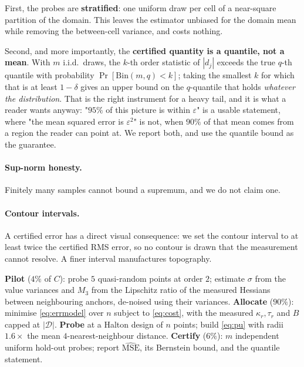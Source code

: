 \documentclass[11pt]{article}
\theoremstyle{definition}
\newcommand{\D}{\mathcal{D}}
\begin{document}
First, the probes are \textbf{stratified}: one uniform draw per cell of a near-square
partition of the domain. This leaves the estimator unbiased for the domain mean while
removing the between-cell variance, and costs nothing.

Second, and more importantly, the \textbf{certified quantity is a quantile, not a mean}.
With $m$ i.i.d.\ draws, the $k$-th order statistic of $|d_j|$ exceeds the true $q$-th
quantile with probability $\Pr[\mathrm{Bin}(m,q)<k]$; taking the smallest $k$ for which
that is at least $1-\delta$ gives an upper bound on the $q$-quantile that holds
\emph{whatever the distribution}. That is the right instrument for a heavy tail, and it
is what a reader wants anyway: "$95\%$ of this picture is within $\varepsilon$" is a
usable statement, where "the mean squared error is $\varepsilon^2$" is not, when $90\%$
of that mean comes from a region the reader can point at. We report both, and use the
quantile bound as the guarantee.

\paragraph{Sup-norm honesty.} Finitely many samples cannot bound a supremum, and we do
not claim one.

\paragraph{Contour intervals.} A certified error has a direct visual consequence: we set
the contour interval to at least twice the certified RMS error, so no contour is drawn
that the measurement cannot resolve. A finer interval manufactures topography.

\begin{algorithm}[t]
\caption{Certified landscape at budget $C$}
\label{alg:pipeline}
\begin{algorithmic}[1]
\State \textbf{Pilot} ($4\%$ of $C$): probe $5$ quasi-random points at order $2$;
estimate $\sigma$ from the value variances and $M_3$ from the Lipschitz ratio of the
measured Hessians between neighbouring anchors, de-noised using their variances.
\State \textbf{Allocate} ($90\%$): minimise \eqref{eq:errmodel} over $n$ subject to
\eqref{eq:cost}, with the measured $\kappa_r,\tau_r$ and $B$ capped at $|\D|$.
\State \textbf{Probe} at a Halton design \citep{halton1960efficiency} of $n$ points;
build \eqref{eq:pu} with radii $1.6\times$ the mean $4$-nearest-neighbour distance.
\State \textbf{Certify} ($6\%$): $m$ independent uniform hold-out probes;
report $\widehat{\mathrm{MSE}}$, its Bernstein bound, and the quantile statement.
\end{algorithmic}
\end{algorithm}
\end{document}
